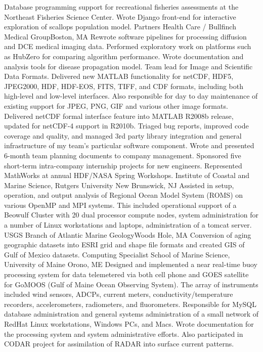 \documentclass[11pt]{moderncv}  %
\begin{document}
{
Database programming support for recreational fisheries assessments
at the Northeast Fisheries Science Center. Wrote Django front-end for
interactive exploration of scallops population model.
}
{
	Partners Health Care / Bullfinch Medical Group}{Boston, MA}{}{
    Rewrote software pipelines for processing diffusion and DCE medical
    imaging data.  Performed exploratory work on platforms such as
    HubZero  for comparing algorithm performance. Wrote documentation
    and analysis tools for disease propagation model.
}
{   
Team lead for Image and Scientific Data Formats.  Delivered new MATLAB functionality for netCDF, HDF5, JPEG2000, HDF, HDF-EOS, FITS, TIFF, and CDF formats, including both high-level and low-level interfaces.  Also responsible for day to day maintenance of existing support for JPEG, PNG, GIF and various other image formats.  Delivered netCDF formal interface feature into MATLAB R2008b release, updated for netCDF-4 support in R2010b. Triaged bug reports, improved code coverage and quality, and managed 3rd party library integration and general infrastructure of my team's particular software component.  Wrote and presented 6-month team planning documents to company management.  Sponsored five short-term intra-company internship projects for new engineers.  Represented MathWorks at annual HDF/NASA Spring Workshops.
}
{
	Institute of Coastal and Marine Science, Rutgers University}
    {New Brunswick, NJ}{} {
Assisted in setup,  operation, and output analysis  of Regional Ocean Model System (ROMS) on various OpenMP and MPI systems.  This included operational support of a Beowulf Cluster with 20 dual processor compute nodes, system administration for a number of Linux workstations and laptops, administration of a tomcat server.
}
{
	USGS Branch of Atlantic Marine Geology}{Woods Hole, MA}{}{
    Conversion of aging geographic datasets into ESRI grid and shape
    file formats and created GIS of Gulf of Mexico datasets.
}
{Computing Specialist}
{School of Marine Science, University of Maine}
{Orono, ME}{}
{
    Designed and implemented a near real-time buoy processing system
    for data telemetered via both cell phone and GOES satellite for
    GoMOOS (Gulf of Maine Ocean Observing System).   The array of
    instruments included wind sensors, ADCPs, current meters,
    conductivity/temperature recorders, accelerometers, radiometers,
    and fluorometers.   Responsible for MySQL database administration
    and general systems administration of a small network of RedHat
    Linux workstations, Windows PCs, and Macs.   Wrote documentation
    for the processing system and system administrative efforts.
    Also participated in CODAR project for assimilation of RADAR
    into surface current patterns.
}
\end{document}
